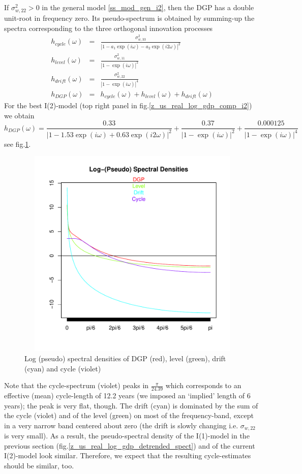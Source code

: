 \documentclass[a4paper]{book}
\begin{document}
If $\sigma_{w,22}^2>0$ in the general model \ref{ss_mod_gen_i2}, then the DGP has a double unit-root in frequency zero. Its pseudo-spectrum is obtained by summing-up the spectra corresponding to the three orthogonal innovation processes
\begin{eqnarray*}
h_{cycle}(\omega)&=&\frac{\sigma_{w,33}^2}{|1-a_1\exp(i\omega)-a_2\exp(i2\omega)|^2}\\
h_{level}(\omega)&=&\frac{\sigma_{w,11}^2}{|1-\exp(i\omega)|^2}\\
h_{drift}(\omega)&=&\frac{\sigma_{w,22}^2}{|1-\exp(i\omega)|^4}\\
h_{DGP}(\omega)&=&h_{cycle}(\omega)+h_{level}(\omega)+h_{drift}(\omega)
\end{eqnarray*}
For the best I(2)-model (top right panel in fig.\ref{z_us_real_log_gdp_comp_i2}) we obtain
\[
h_{DGP}(\omega)=\frac{0.33}{|1-1.53\exp(i\omega)+0.63\exp(i2\omega)|^2}+
\frac{0.37}{|1-\exp(i\omega)|^2}+\frac{0.000125}{|1-\exp(i\omega)|^4}
\]
see fig.\ref{z_us_real_log_gdp_detrended_spect_i2}.
\begin{figure}[H]\begin{center}\includegraphics[height=4in, width=6in]{z_us_real_log_gdp_detrended_spect_i2}\caption{Log (pseudo) spectral densities of DGP (red), level (green), drift (cyan) and cycle (violet) \label{z_us_real_log_gdp_detrended_spect_i2}}\end{center}\end{figure}Note that the cycle-spectrum (violet) peaks in $\displaystyle{\frac{\pi}{24.39}}$ which corresponds to an effective (mean) cycle-length of 12.2 years (we imposed an `implied' length of 6 years); the peak is very flat, though. The drift (cyan) is dominated by the sum of the cycle (violet) and of the level (green) on most of the frequency-band, except in a very narrow band centered about zero (the drift is slowly changing i.e. $\sigma_{w,22}$ is very small). As a result, the pseudo-spectral density of the I(1)-model in the previous section (fig.\ref{z_us_real_log_gdp_detrended_spect}) and of the current I(2)-model look similar. Therefore, we expect that the resulting cycle-estimates should be similar, too. \\
\end{document}
